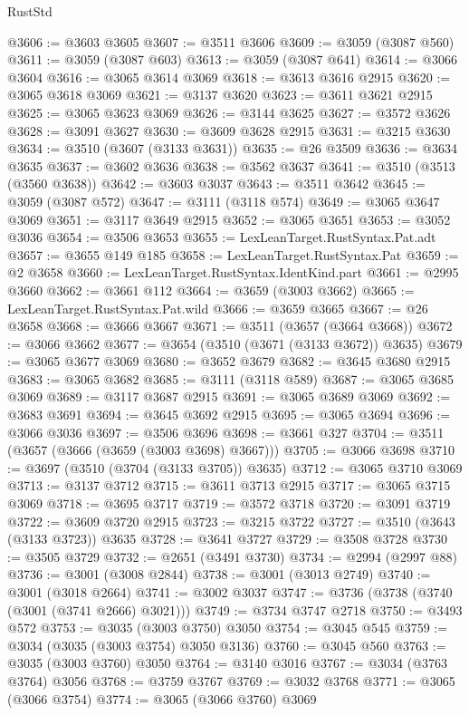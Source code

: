 \begin{lexlean}{RustStd}
\begin{coremodule}
@3606 := @3603 @3605
@3607 := @3511 @3606
@3609 := @3059 (@3087 @560)
@3611 := @3059 (@3087 @603)
@3613 := @3059 (@3087 @641)
@3614 := @3066 @3604
@3616 := @3065 @3614 @3069
@3618 := @3613 @3616 @2915
@3620 := @3065 @3618 @3069
@3621 := @3137 @3620
@3623 := @3611 @3621 @2915
@3625 := @3065 @3623 @3069
@3626 := @3144 @3625
@3627 := @3572 @3626
@3628 := @3091 @3627
@3630 := @3609 @3628 @2915
@3631 := @3215 @3630
@3634 := @3510 (@3607 (@3133 @3631))
@3635 := @26 @3509
@3636 := @3634 @3635
@3637 := @3602 @3636
@3638 := @3562 @3637
@3641 := @3510 (@3513 (@3560 @3638))
@3642 := @3603 @3037
@3643 := @3511 @3642
@3645 := @3059 (@3087 @572)
@3647 := @3111 (@3118 @574)
@3649 := @3065 @3647 @3069
@3651 := @3117 @3649 @2915
@3652 := @3065 @3651
@3653 := @3052 @3036
@3654 := @3506 @3653
@3655 := LexLeanTarget.RustSyntax.Pat.adt
@3657 := @3655 @149 @185
@3658 := LexLeanTarget.RustSyntax.Pat
@3659 := @2 @3658
@3660 := LexLeanTarget.RustSyntax.IdentKind.part
@3661 := @2995 @3660
@3662 := @3661 @112
@3664 := @3659 (@3003 @3662)
@3665 := LexLeanTarget.RustSyntax.Pat.wild
@3666 := @3659 @3665
@3667 := @26 @3658
@3668 := @3666 @3667
@3671 := @3511 (@3657 (@3664 @3668))
@3672 := @3066 @3662
@3677 := @3654 (@3510 (@3671 (@3133 @3672)) @3635)
@3679 := @3065 @3677 @3069
@3680 := @3652 @3679
@3682 := @3645 @3680 @2915
@3683 := @3065 @3682
@3685 := @3111 (@3118 @589)
@3687 := @3065 @3685 @3069
@3689 := @3117 @3687 @2915
@3691 := @3065 @3689 @3069
@3692 := @3683 @3691
@3694 := @3645 @3692 @2915
@3695 := @3065 @3694
@3696 := @3066 @3036
@3697 := @3506 @3696
@3698 := @3661 @327
@3704 := @3511 (@3657 (@3666 (@3659 (@3003 @3698) @3667)))
@3705 := @3066 @3698
@3710 := @3697 (@3510 (@3704 (@3133 @3705)) @3635)
@3712 := @3065 @3710 @3069
@3713 := @3137 @3712
@3715 := @3611 @3713 @2915
@3717 := @3065 @3715 @3069
@3718 := @3695 @3717
@3719 := @3572 @3718
@3720 := @3091 @3719
@3722 := @3609 @3720 @2915
@3723 := @3215 @3722
@3727 := @3510 (@3643 (@3133 @3723)) @3635
@3728 := @3641 @3727
@3729 := @3508 @3728
@3730 := @3505 @3729
@3732 := @2651 (@3491 @3730)
@3734 := @2994 (@2997 @88)
@3736 := @3001 (@3008 @2844)
@3738 := @3001 (@3013 @2749)
@3740 := @3001 (@3018 @2664)
@3741 := @3002 @3037
@3747 := @3736 (@3738 (@3740 (@3001 (@3741 @2666) @3021)))
@3749 := @3734 @3747 @2718
@3750 := @3493 @572
@3753 := @3035 (@3003 @3750) @3050
@3754 := @3045 @545
@3759 := @3034 (@3035 (@3003 @3754) @3050 @3136)
@3760 := @3045 @560
@3763 := @3035 (@3003 @3760) @3050
@3764 := @3140 @3016
@3767 := @3034 (@3763 @3764) @3056
@3768 := @3759 @3767
@3769 := @3032 @3768
@3771 := @3065 (@3066 @3754)
@3774 := @3065 (@3066 @3760) @3069

\end{coremodule}
\end{lexlean}
